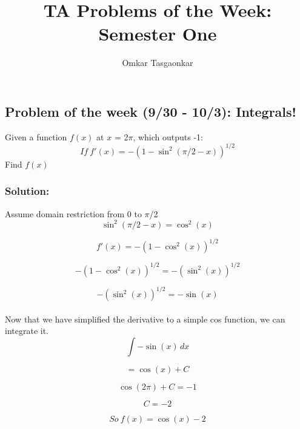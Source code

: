 \documentclass{article}
\title{TA Problems of the Week: Semester One}
\author{Omkar Tasgaonkar}
\begin{document}
\maketitle
\tableofcontents
\pagebreak

\subsection{Problem of the week (9/30 - 10/3): Integrals!}
Given a function $f(x)$ at $x$ = 2$\pi$, which outputs -1:\\


\begin{equation}
If\ f'(x) = -(1 - \sin^{2}(\pi/2 - x))^{1/2}
\end{equation}
Find $f(x)$\\


\subsubsection{Solution:}
Assume domain restriction from 0 to $\pi$/2\\


\begin{equation}
\sin^{2}(\pi/2 -x) = \cos^{2}(x)
\end{equation}

\begin{equation}
f'(x) = -(1 - \cos^{2}(x))^{1/2}
\end{equation}

\begin{equation}
-(1 - \cos^{2}(x))^{1/2} = -(\sin^{2}(x))^{1/2}
\end{equation}

\begin{equation}
-(\sin^{2}(x))^{1/2} = -\sin(x)
\end{equation}
 \\
Now that we have simplified the derivative to a simple cos function, we can integrate it.\\
\[\int -\sin(x) \,dx \]

\begin{equation}
 = \cos(x) + C
\end{equation}

\begin{equation}
\cos(2\pi) + C = -1
\end{equation}

\begin{equation}
C = -2
\end{equation}

\begin{equation}
So\ f(x) = \cos(x) - 2
\end{equation}
\end{document}

